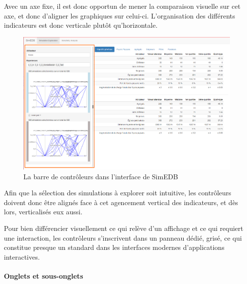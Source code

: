 			Avec un axe \og fixe\fg{}, il est donc opportun de mener la comparaison visuelle sur cet axe, et donc d'aligner les graphiques sur celui-ci. L'organisation des différents indicateurs est donc verticale plutôt qu'horizontale.
			
			\begin{figure}[H]
				\centering
				\includegraphics[width=\linewidth]{img/SimEDB_sidebar_cut.png}
				\caption{La barre de contrôleurs dans l'interface de SimEDB}
				\label{fig:simedb-sidebar}
			\end{figure}
		
			Afin que la sélection des simulations à explorer soit intuitive, les contrôleurs doivent donc être alignés face à cet agencement vertical des indicateurs, et dès lors, verticalisés eux aussi.
			
			Pour bien différencier visuellement ce qui relève d'un affichage et ce qui requiert une interaction, les contrôleurs s'inscrivent dans un panneau dédié, grisé, ce qui constitue presque un standard dans les interfaces modernes d'applications interactives.
			
			\paragraph*{Onglets et sous-onglets}
			
